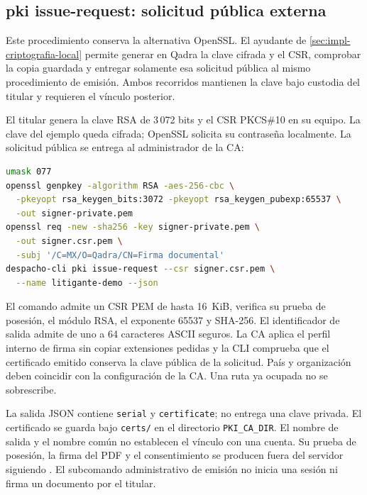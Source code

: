 \subsection{pki issue-request: solicitud pública externa}
\label{sec:cli-pki-request}

Este procedimiento conserva la alternativa OpenSSL. El ayudante de
\cref{sec:impl-criptografia-local} permite generar en Qadra la clave cifrada
y el CSR, comprobar la copia guardada y entregar solamente esa solicitud
p\'ublica al mismo procedimiento de emisi\'on. Ambos recorridos mantienen
la clave bajo custodia del titular y requieren el v\'inculo posterior.

El titular genera la clave RSA de 3\,072 bits y el CSR PKCS\#10 en su equipo.
La clave del ejemplo queda cifrada; OpenSSL solicita su contrase\~na localmente.
La solicitud p\'ublica se entrega al administrador de la CA:

\begin{lstlisting}[language=bash, numbers=none]
umask 077
openssl genpkey -algorithm RSA -aes-256-cbc \
  -pkeyopt rsa_keygen_bits:3072 -pkeyopt rsa_keygen_pubexp:65537 \
  -out signer-private.pem
openssl req -new -sha256 -key signer-private.pem \
  -out signer.csr.pem \
  -subj '/C=MX/O=Qadra/CN=Firma documental'
despacho-cli pki issue-request --csr signer.csr.pem \
  --name litigante-demo --json
\end{lstlisting}

El comando admite un CSR PEM de hasta 16~KiB, verifica su prueba de posesión,
el módulo RSA, el exponente 65537 y SHA-256. El identificador de salida admite
de uno a 64 caracteres ASCII seguros. La CA aplica el perfil interno de firma
sin copiar extensiones pedidas y la CLI comprueba que el certificado emitido
conserva la clave pública de la solicitud. País y organización deben coincidir
con la configuración de la CA. Una ruta ya ocupada no se sobrescribe.

La salida JSON contiene \texttt{serial} y \texttt{certificate}; no entrega una
clave privada. El certificado se guarda bajo \texttt{certs/} en el directorio
\texttt{PKI\_CA\_DIR}. El nombre de salida y el nombre común no establecen el
vínculo con una cuenta. Su prueba de posesión, la firma del PDF y el
consentimiento se producen fuera del servidor siguiendo
\rutarepo{docs/individual-signing-guide.md}. El subcomando administrativo de
emisión no inicia una sesión ni firma un documento por el titular.
